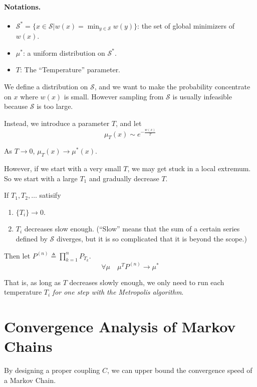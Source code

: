         \paragraph{Notations.}
        \begin{itemize}
            \item $\mathcal{S}^* = \{x\in\mathcal{S}|w(x) = \min_{y\in\mathcal{S}} w(y)\}$: the set of global minimizers of $w(x)$.
            \item $\mu^*$: a uniform distribution on $\mathcal{S}^*$.
            \item $T$: The ``Temperature'' parameter.
        \end{itemize}
        \par We define a distribution on $\mathcal{S}$, and we want to make the probability concentrate on $x$ where $w(x)$ is small. However sampling from $\mathcal{S}$ is usually infeasible because $\mathcal{S}$ is too large.
        \par Instead, we introduce a parameter $T$, and let
        \[ \mu_T(x) \sim e^{-\frac{w(x)}{T}} \]
        \begin{proposition}
            As $T \to 0$, $\mu_T(x) \to \mu^*(x)$.
        \end{proposition}
        \par However, if we start with a very small $T$, we may get stuck in a local extremum. So we start with a large $T_1$ and gradually decrease $T$.
        \begin{theorem}
            If $T_1,T_2,\dots$ satisify
            \begin{enumerate}
                \item $\{T_i\} \to 0$.
                \item $T_i$ decreases slow enough. (``Slow'' means that the sum of a certain series defined by $\mathcal{S}$ diverges, but it is so complicated that it is beyond the scope.)
            \end{enumerate}
            Then let $P^{(n)} \triangleq \prod_{k=1}^n P_{T_k}$.
            \[ \forall \mu \quad \mu^TP^{(n)} \to \mu^* \]
        \end{theorem}
        That is, as long as $T$ decreases slowly enough, we only need to run each temperature $T_i$ \emph{for one step with the Metropolis algorithm}.


\section{Convergence Analysis of Markov Chains}
    By designing a proper coupling $C$, we can upper bound the convergence speed of a Markov Chain.

